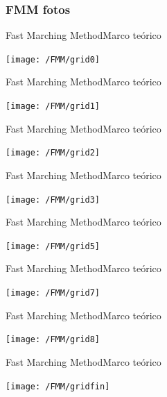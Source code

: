 \documentclass[10pt]{beamer}
\begin{document}
\subsubsection{FMM fotos}
\begin{frame}{Fast Marching Method}{Marco teórico}
	\begin{center}	
	\texttt{[image: /FMM/grid0]}	
	\end{center}
\end{frame}
\begin{frame}{Fast Marching Method}{Marco teórico}\addtocounter{framenumber}{-1}
	\begin{center}	
	\texttt{[image: /FMM/grid1]}	
	\end{center}
\end{frame}
\begin{frame}{Fast Marching Method}{Marco teórico}\addtocounter{framenumber}{-1}
	\begin{center}	
	\texttt{[image: /FMM/grid2]}	
	\end{center}
\end{frame}
\begin{frame}{Fast Marching Method}{Marco teórico}\addtocounter{framenumber}{-1}
	\begin{center}	
	\texttt{[image: /FMM/grid3]}	
	\end{center}
\end{frame}
\begin{frame}{Fast Marching Method}{Marco teórico}\addtocounter{framenumber}{-1}
	\begin{center}	
	\texttt{[image: /FMM/grid5]}	
	\end{center}
\end{frame}
\begin{frame}{Fast Marching Method}{Marco teórico}\addtocounter{framenumber}{-1}
	\begin{center}	
	\texttt{[image: /FMM/grid7]}	
	\end{center}
\end{frame}
\begin{frame}{Fast Marching Method}{Marco teórico}\addtocounter{framenumber}{-1}
	\begin{center}	
	\texttt{[image: /FMM/grid8]}	
	\end{center}
\end{frame}
\begin{frame}{Fast Marching Method}{Marco teórico}\addtocounter{framenumber}{-1}
	\begin{center}	
	\texttt{[image: /FMM/gridfin]}	
	\end{center}
\end{frame}
\end{document}
